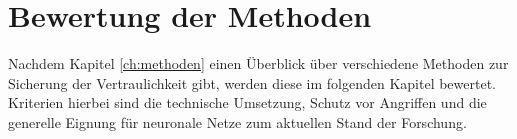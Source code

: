 \chapter{Bewertung der Methoden}

Nachdem Kapitel \ref{ch:methoden} einen Überblick über verschiedene Methoden zur Sicherung der Vertraulichkeit gibt, werden diese im folgenden Kapitel bewertet.
Kriterien hierbei sind die technische Umsetzung, Schutz vor Angriffen und die generelle Eignung für neuronale Netze zum aktuellen Stand der Forschung.





